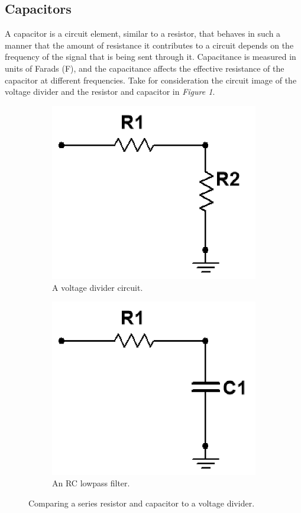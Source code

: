 \documentclass[12pt]{article}
\begin{document}
\subsection{Capacitors}

A capacitor is a circuit element, similar to a resistor, that behaves in such a manner that the amount of resistance it contributes to a circuit depends on the frequency of the signal that is being sent through it.  Capacitance is measured in units of Farads (F), and the capacitance affects the effective resistance of the capacitor at different frequencies. Take for consideration the circuit image of the voltage divider and the resistor and capacitor in \textit{Figure 1}.

\begin{figure}[H]
\begin{subfigure}{.5\textwidth}
    \centering
    \includegraphics[width=0.8\linewidth]{photos/lab/voltagediv.png}
    \caption{A voltage divider circuit.}
\end{subfigure}%
\begin{subfigure}{.5\textwidth}
  \centering
  \includegraphics[width=0.79\linewidth]{photos/lab/RC.png}
  \caption{An RC lowpass filter.}
\end{subfigure}
\caption{Comparing a series resistor and capacitor to a voltage divider.}
\end{figure}
\end{document}
